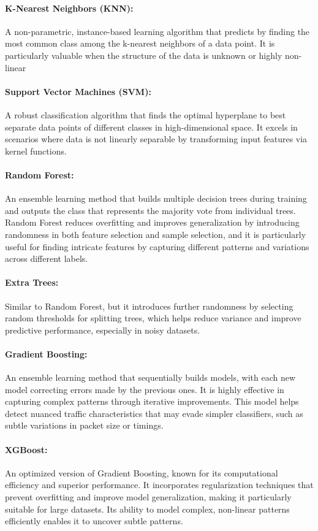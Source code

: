 \paragraph{K-Nearest Neighbors (KNN):} A non-parametric, instance-based learning algorithm that predicts by finding the most common class among the k-nearest neighbors of a data point. It is particularly valuable when the structure of the data is unknown or highly non-linear
\paragraph{Support Vector Machines (SVM):} A robust classification algorithm that finds the optimal hyperplane to best separate data points of different classes in high-dimensional space. It excels in scenarios where data is not linearly separable by transforming input features via kernel functions.
\paragraph{Random Forest:} An ensemble learning method that builds multiple decision trees during training and outputs the class that represents the majority vote from individual trees. Random Forest reduces overfitting and improves generalization by introducing randomness in both feature selection and sample selection, and it is particularly useful for finding intricate features by capturing different patterns and variations across different labels.
\paragraph{Extra Trees:} Similar to Random Forest, but it introduces further randomness by selecting random thresholds for splitting trees, which helps reduce variance and improve predictive performance, especially in noisy datasets.
\paragraph{Gradient Boosting:} An ensemble learning method that sequentially builds models, with each new model correcting errors made by the previous ones. It is highly effective in capturing complex patterns through iterative improvements. This model helps detect nuanced traffic characteristics that may evade simpler classifiers, such as subtle variations in packet size or timings.
\paragraph{XGBoost:} An optimized version of Gradient Boosting, known for its computational efficiency and superior performance. It incorporates regularization techniques that prevent overfitting and improve model generalization, making it particularly suitable for large datasets. Its ability to model complex, non-linear patterns efficiently enables it to uncover subtle patterns.

